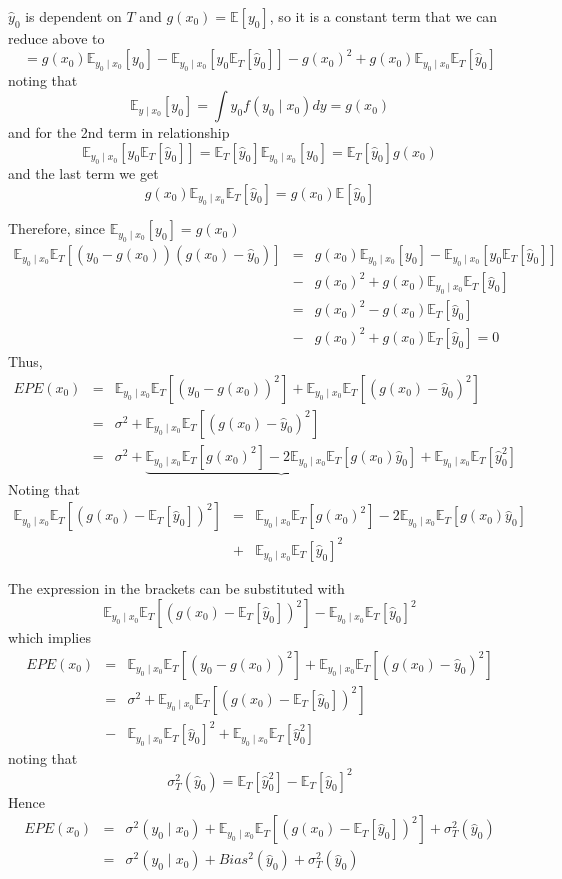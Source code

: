 \documentclass{beamer}
\newcommand{\E}{\mathbb{E}}
\begin{document}
\begin{frame}
$\hat{y}_0$ is dependent on $T$ and $g(x_0)=\E[y_0]$, so it is a constant term that we can reduce above to
\[
=g(x_0)\E_{y_0\mid x_0}[y_0]-\E_{y_0\mid x_0}[y_0\E_T[\hat{y}_0]]-g(x_0)^2+g(x_0)\E_{y_0\mid x_0}\E_T[\hat{y}_0]
\]
noting that
\[
\E_{y\mid x_0}[y_0]=\int y_0 f(y_0\mid x_0)dy=g(x_0)
\]
and for the 2nd term in relationship
\[
\E_{y_0\mid x_0}[y_0\E_T[\hat{y}_0]]=\E_T[\hat{y}_0]\E_{y_0\mid x_0}[y_0]=\E_T[\hat{y}_0]g(x_0)
\]
and the last term we get
\[
g(x_0)\E_{y_0\mid x_0}\E_T[\hat{y}_0]=g(x_0)\E[\hat{y}_0]
\]
\end{frame}
\begin{frame}
Therefore, since $\E_{y_0\mid x_0}[y_0]=g(x_0)$
\begin{eqnarray*}
\E_{y_0\mid x_0}\E_T[(y_0-g(x_0))(g(x_0)-\hat{y}_0)]&=&g(x_0)\E_{y_0\mid x_0}[y_0]-\E_{y_0\mid x_0}[y_0\E_T[\hat{y}_0]]\\
&-&g(x_0)^2+g(x_0)\E_{y_0\mid x_0}\E_T[\hat{y}_0]\\
&=&g(x_0)^2-g(x_0)\E_{T}[\hat{y}_0]\\
&-&g(x_0)^2+g(x_0)\E_T[\hat{y}_0]=0
\end{eqnarray*}
Thus,
\begin{eqnarray*}
EPE(x_0)&=&\E_{y_0\mid x_0}\E_T[(y_0-g(x_0))^2]+\E_{y_0\mid x_0}\E_T[(g(x_0)-\hat{y}_0)^2]\\
&=&\sigma^2+\E_{y_0\mid x_0}\E_T[(g(x_0)-\hat{y}_0)^2]\\
&=&\sigma^2+\underbrace{\E_{y_0\mid x_0}\E_T[g(x_0)^2]-2\E_{y_0\mid x_0}\E_T[g(x_0)\hat{y}_0]}+\E_{y_0\mid x_0}\E_T[\hat{y}_0^2]
\end{eqnarray*}
Noting that
\begin{eqnarray*}
\E_{y_0\mid x_0}\E_T[(g(x_0)-\E_T[\hat{y}_0])^2]&=&\E_{y_0\mid x_0}\E_T[g(x_0)^2]-2\E_{y_0\mid x_0}\E_T[g(x_0)\hat{y}_0]\\
&+&\E_{y_0\mid x_0}\E_T[\hat{y}_0]^2
\end{eqnarray*}
\end{frame}
\begin{frame}
The expression in the brackets can be substituted with
\[
 \E_{y_0\mid x_0}\E_T[(g(x_0)-\E_T[\hat{y}_0])^2]-\E_{y_0\mid x_0}\E_T[\hat{y}_0]^2
\]
which implies
\begin{eqnarray*}
EPE(x_0)&=&\E_{y_0\mid x_0}\E_T[(y_0-g(x_0))^2]+\E_{y_0\mid x_0}\E_T[(g(x_0)-\hat{y}_0)^2]\\
&=&\sigma^2+\E_{y_0\mid x_0}\E_T[(g(x_0)-\E_T[\hat{y}_0])^2]\\
&-&\E_{y_0\mid x_0}\E_T[\hat{y}_0]^2+\E_{y_0\mid x_0}\E_T[\hat{y}_0^2]
\end{eqnarray*}
noting that
\[
\sigma^2_T(\hat{y}_0)=\E_T[\hat{y}_0^2]-\E_T[\hat{y}_0]^2
\]
Hence
\begin{eqnarray*}
EPE(x_0)&=&\sigma^2(y_0\mid x_0)+\E_{y_0\mid x_0}\E_T[(g(x_0)-\E_T[\hat{y}_0])^2]+\sigma_T^2(\hat{y}_0)\\
&=&\sigma^2(y_0\mid x_0)+Bias^2(\hat{y}_0)+\sigma_T^2(\hat{y}_0)
\end{eqnarray*}
\end{frame}
%
%
\end{document}
